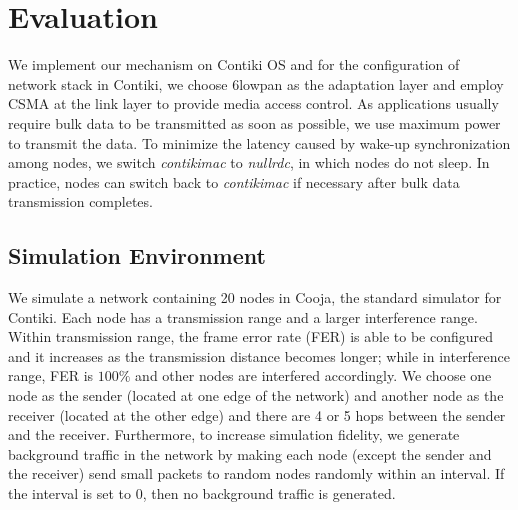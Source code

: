 \documentclass[runningheads,a4paper]{llncs}
\begin{document}
\section{Evaluation}
We implement our mechanism on Contiki OS and for the configuration of network stack in Contiki, we choose 6lowpan as the adaptation layer and employ CSMA at the link layer to provide media access control. As applications usually require bulk data to be transmitted as soon as possible, we use maximum power to transmit the data. To minimize the latency caused by wake-up synchronization among nodes, we switch \textit{contikimac} to \textit{nullrdc}, in which nodes do not sleep. In practice, nodes can switch back to \textit{contikimac} if necessary after bulk data transmission completes.

\subsection{Simulation Environment}
We simulate a network containing 20 nodes in Cooja, the standard simulator for Contiki. Each node has a transmission range and a larger interference range. Within transmission range, the frame error rate (FER) is able to be configured and it increases as the transmission distance becomes longer; while in interference range, FER is $100\%$ and other nodes are interfered accordingly. We choose one node as the sender (located at one edge of the network) and another node as the receiver (located at the other edge) and there are 4 or 5 hops between the sender and the receiver. Furthermore, to increase simulation fidelity, we generate background traffic in the network by making each node (except the sender and the receiver) send small packets to random nodes randomly within an interval. If the interval is set to 0, then no background traffic is generated.
\end{document}
